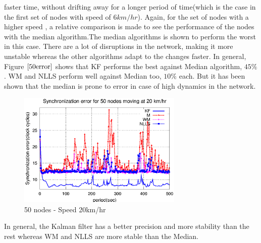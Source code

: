 \documentclass[a4paper,10pt]{report}
\begin{document}
faster time, without drifting away for a longer period of time(which is the case in the first set of nodes with speed of $6km/hr$).
Again, for the set of nodes with a higher speed , a relative comparison is made to see the performance of the nodes with the
median algorithm.\newline The median algorithms is shown to perform the worst in this case. There are a lot of disruptions in the
network, making it more unstable whereas the other algorithms adapt to the changes faster.
\newline In general, Figure $\ref{50error}$ shows that KF performs the best against Median algorithm, $45\%$. WM and NLLS perform well against Median too, $10\%$ each. But it has been shown that the median is prone to error in case of high dynamics in the network.
\begin{figure}
\centering
\includegraphics[width=0.7\textwidth]{50output-s20}
\caption{50 nodes - Speed 20km/hr} \label{50output20}
\end{figure}
In general, the Kalman filter has a better precision and more stability than the rest whereas WM and NLLS are more stable than the Median.
\end{document}
